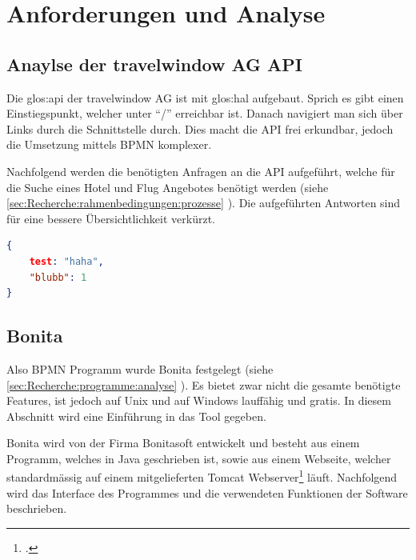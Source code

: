 

\chapter{Anforderungen und Analyse}
\label{sec:analyse}

\section{Anaylse der travelwindow AG API}
Die \Gls{glos:api} der travelwindow AG ist mit \Gls{glos:hal} aufgebaut. Sprich es gibt einen Einstiegspunkt, welcher unter "`/"' erreichbar ist. Danach navigiert man sich über Links durch die Schnittstelle durch. Dies macht die API frei erkundbar, jedoch die Umsetzung mittels BPMN komplexer.

Nachfolgend werden die benötigten Anfragen an die API aufgeführt, welche für die Suche eines Hotel und Flug Angebotes benötigt werden (siehe \cref{sec:Recherche:rahmenbedingungen:prozesse} ). Die aufgeführten Antworten sind für eine bessere Übersichtlichkeit verkürzt.


\begin{lstlisting}[language=json,firstnumber=1]
{
	test: "haha",
	"blubb": 1
}
\end{lstlisting}

\section{Bonita}
Also BPMN Programm wurde Bonita festgelegt (siehe \cref{sec:Recherche:programme:analyse} ). Es bietet zwar nicht die gesamte benötigte Features, ist jedoch auf Unix und auf Windows lauffähig und gratis. In diesem Abschnitt wird eine Einführung in das Tool gegeben. 

Bonita wird von der Firma Bonitasoft entwickelt und besteht aus einem Programm, welches in Java geschrieben ist, sowie aus einem Webseite, welcher standardmässig auf einem mitgelieferten Tomcat Webserver\footcite{Tomcat_2016-06-12} läuft.
Nachfolgend wird das Interface des Programmes und die verwendeten Funktionen der Software beschrieben.

